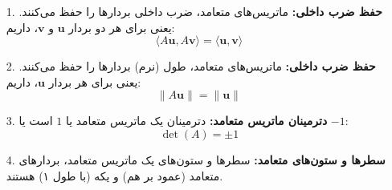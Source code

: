 \begin{nokteh}
	
\begin{itemize}
	\item[1. ] 
	\textbf{حفظ ضرب داخلی: }ماتریس‌های متعامد، ضرب داخلی بردارها را حفظ می‌کنند. یعنی برای هر دو بردار \( \mathbf{u} \) و \( \mathbf{v} \)، داریم:
	\[
	\langle A \mathbf{u}, A \mathbf{v} \rangle = \langle \mathbf{u}, \mathbf{v} \rangle
	\]
	
	\item [2. ]  \textbf{حفظ ضرب داخلی:}
ماتریس‌های متعامد، طول (نرم) بردارها را حفظ می‌کنند. یعنی برای هر بردار \( \mathbf{u} \)، داریم:
	\[
	\| A \mathbf{u} \| = \| \mathbf{u} \|
	\]
	
	\item [3. ] \textbf{دترمینان ماتریس متعامد:}
	دترمینان یک ماتریس متعامد یا \(1 \) است یا \( -1 \):
	\[
	\det(A) = \pm 1
	\]
	
	\item [4. ] \textbf{سطرها و ستون‌های متعامد:}
سطرها و ستون‌های یک ماتریس متعامد، بردارهای متعامد (عمود بر هم) و یکه (با طول ۱) هستند.
	
\end{itemize}

\end{nokteh}

